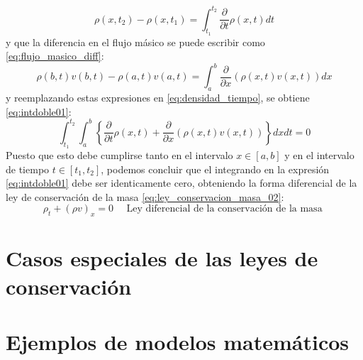 \begin{equation}\label{eq:densidad_variable}
\rho\left(x, t_{2}\right)-\rho\left(x, t_{1}\right)=\int_{t_{1}}^{t_{2}} \frac{\partial}{\partial t} \rho(x, t) d t
\end{equation}
y que la diferencia en el flujo másico se puede escribir como \eqref{eq:flujo_masico_diff}: 
\begin{equation}\label{eq:flujo_masico_diff}
\rho\left(b, t\right) v\left(b, t\right)-\rho\left(a, t\right) v\left(a, t\right)=\int_{a}^{b} \frac{\partial}{\partial x}(\rho(x, t) v(x, t)) d x
\end{equation}
y reemplazando estas expresiones en \eqref{eq:densidad_tiempo}, se obtiene \eqref{eq:intdoble01}:
\begin{equation}\label{eq:intdoble01}
\int_{t_{1}}^{t_{2}} \int_{a}^{b}\left\{\frac{\partial}{\partial t} \rho(x, t)+\frac{\partial}{\partial x}(\rho(x, t) v(x, t))\right\} d x d t=0
\end{equation}
Puesto que esto debe cumplirse tanto en el intervalo  $x\in\left[a, b\right]$ y en el intervalo de tiempo $t\in\left[t_{1}, t_{2}\right]$, podemos concluir que el integrando en la expresión \eqref{eq:intdoble01} debe ser identicamente cero, obteniendo la forma diferencial de la ley de conservación de la masa \eqref{eq:ley_conservacion_masa_02}:
\begin{equation}\label{eq:ley_conservacion_masa_02}
\rho_{t}+(\rho v)_{x}=0 \quad \text { Ley diferencial de la conservación de la masa }
\end{equation}

\section{Casos especiales de las leyes de conservación}

\section{Ejemplos de modelos matemáticos}


